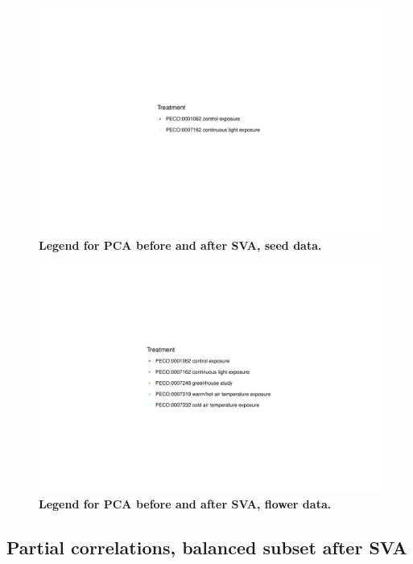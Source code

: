 \documentclass[12pt]{article}
\begin{document}
\begin{figure}[H]
\centering
\includegraphics[width = \linewidth]{figures/appendix_a/pca_beforeAndAfterSva_seed_legend_2023-02-21.pdf}
\caption{\textbf{Legend for PCA before and after SVA, seed data.}}%
\label{fig::pcaLegendSeed}
\end{figure}

\begin{figure}[H]
\centering
\includegraphics[width = \linewidth]{figures/appendix_a/pca_beforeAndAfterSva_flower_legend_2023-02-21.pdf}
\caption{\textbf{Legend for PCA before and after SVA, flower data.}}%
\label{fig::pcaLegendFlower}
\end{figure}

\newpage %
\subsection*{Partial correlations, balanced subset after SVA}
\end{document}
